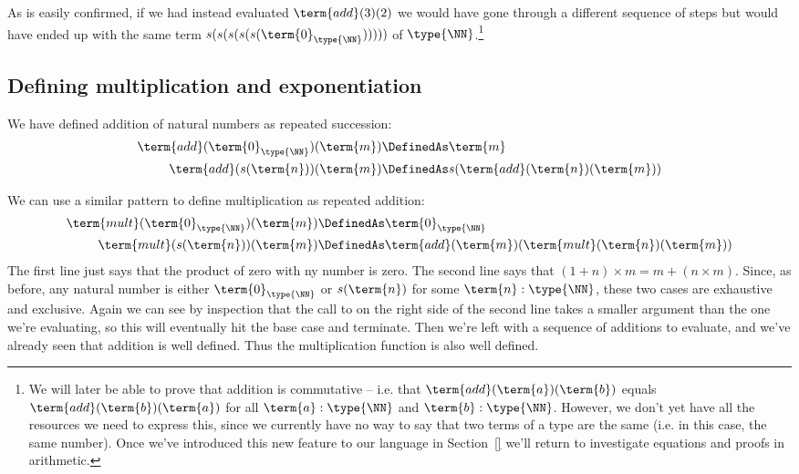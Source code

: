 As is easily confirmed, if we had instead evaluated $\term{add}(3)(2)$ we would have gone through a different sequence of steps but would have ended up with the same term $s(s(s(s(s(\term{0}_{\type{\NN}})))))$ of $\type{\NN}$.\footnote{We will later be able to prove that addition is commutative -- i.e. that $\term{add}(\term{a})(\term{b})$ equals $\term{add}(\term{b})(\term{a})$ for all $\term{a}:\type{\NN}$ and $\term{b}:\type{\NN}$.  However, we don't yet have all the resources we need to express this, since we currently have no way to say that two terms of a type are the same (i.e. in this case, the same number).  Once we've introduced this new feature to our language in Section~\ref{} we'll return to investigate equations and proofs in arithmetic.
}
 

\subsection{Defining multiplication and exponentiation}
\label{sec:NaturalNumbers-MultiplicationExponentiation}

We have defined addition of natural numbers as repeated succession:
\begin{align*}
\term{add}(\term{0}_{\type{\NN}})(\term{m}) &\DefinedAs \term{m}
\\
\term{add}(s(\term{n}))(\term{m}) &\DefinedAs
s(\term{add}(\term{n})(\term{m}))
\end{align*}

We can use a similar pattern to define multiplication as repeated addition:
\begin{align*}
\term{mult}(\term{0}_{\type{\NN}})(\term{m}) &\DefinedAs \term{0}_{\type{\NN}}
\\
\term{mult}(s(\term{n}))(\term{m}) &\DefinedAs
\term{add}(\term{m})(\term{mult}(\term{n})(\term{m}))
\end{align*}
The first line just says that the product of zero with ny number is zero.  The second line says that $(1+n) \times m = m + (n \times m)$.  Since, as before, any natural number is either $\term{0}_{\type{\NN}}$ or $s(\term{n})$ for some $\term{n}:\type{\NN}$, these two cases are exhaustive and exclusive.  Again we can see by inspection that the call to  on the right side of the second line takes a smaller argument than the one we're evaluating, so this will eventually hit the base case and terminate.  Then we're left with a sequence of additions to evaluate, and we've already seen that addition is well defined.  Thus the multiplication function is also well defined.

